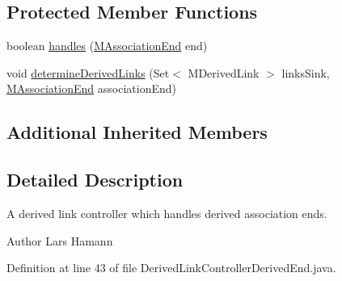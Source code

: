\subsection*{Protected Member Functions}
\begin{DoxyCompactItemize}
\item 
boolean \hyperlink{classorg_1_1tzi_1_1use_1_1uml_1_1sys_1_1_derived_link_controller_derived_end_a6e17e86ec184375af191ba1726f95bbc}{handles} (\hyperlink{classorg_1_1tzi_1_1use_1_1uml_1_1mm_1_1_m_association_end}{M\-Association\-End} end)
\item 
void \hyperlink{classorg_1_1tzi_1_1use_1_1uml_1_1sys_1_1_derived_link_controller_derived_end_a43a3d96678690e3bf0057a4601660d5e}{determine\-Derived\-Links} (Set$<$ M\-Derived\-Link $>$ links\-Sink, \hyperlink{classorg_1_1tzi_1_1use_1_1uml_1_1mm_1_1_m_association_end}{M\-Association\-End} association\-End)
\end{DoxyCompactItemize}
\subsection*{Additional Inherited Members}


\subsection{Detailed Description}
A derived link controller which handles derived association ends. \begin{DoxyAuthor}{Author}
Lars Hamann 
\end{DoxyAuthor}


Definition at line 43 of file Derived\-Link\-Controller\-Derived\-End.\-java.



